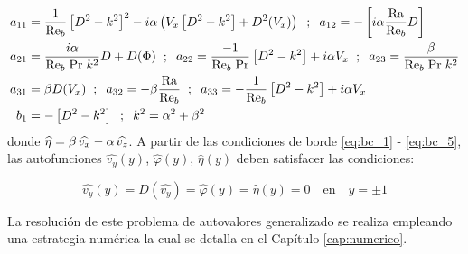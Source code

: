 \begin{align*}
a_{11} &= \frac{1}{\text{Re}_b} \left[ D^2 - k^2 \right]^2 - i \alpha \left( V_x \left[ D^2 - k^2 \right] + D^2(V_x)\right) \hspace{2mm} ; \hspace{2mm} a_{12} = -\left[ i \alpha \frac{\text{Ra}}{\text{Re}_b} D \right] \\
a_{21} &= \frac{i \alpha}{\text{Re}_b \hspace{1mm} \text{Pr} \hspace{1mm} k^2} D + D(\Phi) \hspace{2mm} ; \hspace{2mm} a_{22} = \frac{-1}{\text{Re}_b \hspace{1mm} \text{Pr} } \left[ D^2 - k^2 \right] + i \alpha V_x  \hspace{2mm} ; \hspace{2mm} a_{23} = \frac{\beta}{\text{Re}_b \hspace{1mm} \text{Pr} \hspace{1mm} k^2} \\
a_{31} &= \beta D(V_x) \hspace{2mm} ; \hspace{2mm} a_{32} = - \beta \frac{\text{Ra}}{\text{Re}_b}  \hspace{2mm} ; \hspace{2mm} a_{33} = -\frac{1}{\text{Re}_b} \left[ D^2 - k^2 \right] + i \alpha V_x \\
b_1    &= - \left[ D^2 - k^2 \right] \hspace{2mm} ; \hspace{2mm} k^2 = \alpha^2 + \beta^2 \\
\end{align*}
donde $\widehat{\eta} = \beta \hspace{0.5mm} \widehat{v_x} - \alpha \hspace{0.5mm} \widehat{v_z}$. A partir de las condiciones de borde \ref{eq:bc_1} - \ref{eq:bc_5}, las autofunciones $\widehat{v_y}(y)$, $\widehat{\varphi}(y)$, $\widehat{\eta}(y)$ deben satisfacer las condiciones:

\begin{equation}
\widehat{v_y}(y) = D(\widehat{v_y}) = \widehat{\varphi}(y) = \widehat{\eta}(y) = 0 \quad \text{en} \quad y= \pm 1
\label{eq:eigensis-ci}
\end{equation} 

La resolución de este problema de autovalores generalizado se realiza empleando una estrategia numérica la cual se detalla en el Capítulo \ref{cap:numerico}. 

